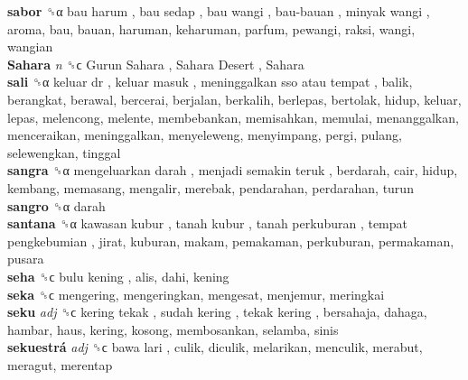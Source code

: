 \textbf{sabor} ␝α   bau harum ,  bau sedap ,  bau wangi ,  bau-bauan ,  minyak wangi , aroma, bau, bauan, haruman, keharuman, parfum, pewangi, raksi, wangi, wangian  \\
\textbf{Sahara} \emph{n}  ␝ϲ   Gurun Sahara ,  Sahara Desert ,  Sahara   \\
\textbf{sali} ␝α   keluar dr ,  keluar masuk ,  meninggalkan sso atau tempat , balik, berangkat, berawal, bercerai, berjalan, berkalih, berlepas, bertolak, hidup, keluar, lepas, melencong, melente, membebankan, memisahkan, memulai, menanggalkan, menceraikan, meninggalkan, menyeleweng, menyimpang, pergi, pulang, selewengkan, tinggal  \\
\textbf{sangra} ␝α   mengeluarkan darah ,  menjadi semakin teruk , berdarah, cair, hidup, kembang, memasang, mengalir, merebak, pendarahan, perdarahan, turun  \\
\textbf{sangro} ␝α  darah  \\
\textbf{santana} ␝α   kawasan kubur ,  tanah kubur ,  tanah perkuburan ,  tempat pengkebumian , jirat, kuburan, makam, pemakaman, perkuburan, permakaman, pusara  \\
\textbf{seha} ␝ϲ   bulu kening , alis, dahi, kening  \\
\textbf{seka} ␝ϲ  mengering, mengeringkan, mengesat, menjemur, meringkai  \\
\textbf{seku} \emph{adj}  ␝ϲ   kering tekak ,  sudah kering ,  tekak kering , bersahaja, dahaga, hambar, haus, kering, kosong, membosankan, selamba, sinis  \\
\textbf{sekuestrá} \emph{adj}  ␝ϲ   bawa lari , culik, diculik, melarikan, menculik, merabut, meragut, merentap  \\
